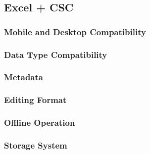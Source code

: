 \documentclass{article}
\begin{document}
\subsection{Excel + CSC}
\subsubsection{Mobile and Desktop Compatibility}
\subsubsection{Data Type Compatibility}
\subsubsection{Metadata}
\subsubsection{Editing Format}
\subsubsection{Offline Operation}
\subsubsection{Storage System}
\end{document}
